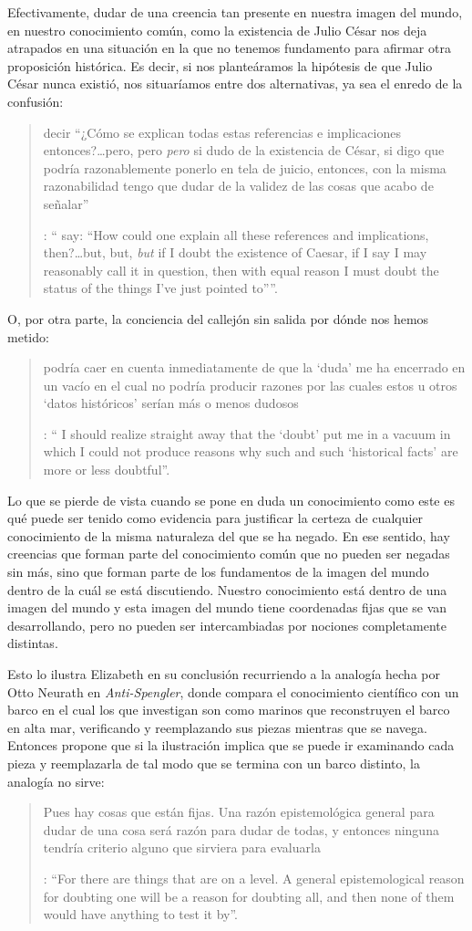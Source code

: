 Efectivamente, dudar de una creencia tan presente en nuestra imagen del mundo, en nuestro conocimiento común, como la existencia de Julio César nos deja atrapados en una situación en la que no tenemos fundamento para afirmar otra proposición histórica. Es decir, si nos planteáramos la hipótesis de que Julio César nunca existió, nos situaríamos entre dos alternativas, ya sea el enredo de la confusión: \blockquote[{\Cite[91]{anscombe1981parmenides:humeandjulius}}: \enquote{\textelp{} say: ``How could one explain all these references and implications, then?\ldots but, but, \emph{but} if I doubt the existence of Caesar, if I say I may reasonably call it in question, then with equal reason I must doubt the status of the things I've just pointed to''}.]{\textelp{} decir ``¿Cómo se explican todas estas referencias e implicaciones entonces?\ldots pero, pero \emph{pero} si dudo de la existencia de César, si digo que podría razonablemente ponerlo en tela de juicio, entonces, con la misma razonabilidad tengo que dudar de la validez de las cosas que acabo de señalar''}. O, por otra parte, la conciencia del callejón sin salida por dónde nos hemos metido: \blockquote[{\Cite[91]{anscombe1981parmenides:humeandjulius}}: \enquote{\textelp{} I should realize straight away that the `doubt' put me in a vacuum in which I could not produce reasons why such and such `historical facts' are more or less doubtful}.]{\textelp{} podría caer en cuenta inmediatamente de que la `duda' me ha encerrado en un vacío en el cual no podría producir razones por las cuales estos u otros `datos históricos' serían más o menos dudosos}.

Lo que se pierde de vista cuando se pone en duda un conocimiento como este es qué puede ser tenido como evidencia para justificar la certeza de cualquier conocimiento de la misma naturaleza del que se ha negado. En ese sentido, hay creencias que forman parte del conocimiento común que no pueden ser negadas sin más, sino que forman parte de los fundamentos de la imagen del mundo dentro de la cuál se está discutiendo. Nuestro conocimiento está dentro de una imagen del mundo y esta imagen del mundo tiene coordenadas fijas que se van desarrollando, pero no pueden ser intercambiadas por nociones completamente distintas.

Esto lo ilustra Elizabeth en su conclusión recurriendo a la analogía hecha por Otto Neurath en \emph{Anti-Spengler}, donde compara el conocimiento científico con un barco en el cual los que investigan son como marinos que reconstruyen el barco en alta mar, verificando y reemplazando sus piezas mientras que se navega. Entonces propone que si la ilustración implica que se puede ir examinando cada pieza y reemplazarla de tal modo que se termina con un barco distinto, la analogía no sirve: \blockquote[{\Cite[92]{anscombe1981parmenides:humeandjulius}}: \enquote{For there are things that are on a level. A general epistemological reason for doubting one will be a reason for doubting all, and then none of them would have anything to test it by}.]{Pues hay cosas que están fijas. Una razón epistemológica general para dudar de una cosa será razón para dudar de todas, y entonces ninguna tendría criterio alguno que sirviera para evaluarla}.

